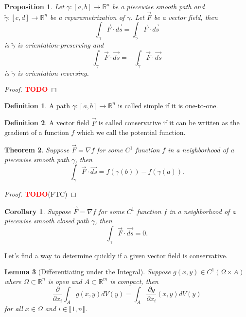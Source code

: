 \documentclass{article}
\theoremstyle{plain}
\newtheorem{theorem}{Theorem}[subsection]
\newtheorem{proposition}[theorem]{Proposition}
\newtheorem{lemma}[theorem]{Lemma}
\newtheorem*{corollary}{Corollary}
\theoremstyle{definition}
\newtheorem*{definition}{Definition}
\newcommand{\R}{\mathbb{R}}
\newcommand{\Iint}[2]{\llbracket #1 , #2 \rrbracket}
\newcommand{\td}{\textcolor{red}{\textbf{TODO}}}
\begin{document}
\begin{proposition}
    Let $\gamma : [a,b] \to \R^n$ be a piecewise smooth path and $\tilde\gamma : [c,d] \to \R^n$ be a reparametrization of $\gamma$. Let $\vec{F}$ be a vector field, then
    $$\int_{\gamma}\vec{F}\cdot \vec{ds} = \int_{\tilde\gamma}\vec{F}\cdot \vec{ds}$$
    is $\tilde\gamma$ is orientation-preserving and 
    $$\int_{\gamma}\vec{F}\cdot \vec{ds} = -\int_{\tilde\gamma}\vec{F}\cdot \vec{ds}$$
    is $\tilde\gamma$ is orientation-reversing.
\end{proposition}

\begin{proof}
    \td 
\end{proof}

\begin{definition}
    A path $\gamma : [a,b] \to \R^n$ is called simple if it is one-to-one.
\end{definition}

\begin{definition}
    A vector field $\vec{F}$ is called conservative if it can be written as the gradient of a function $f$ which we call the potential function.
\end{definition}

\begin{theorem}
    Suppose $\vec{F} = \nabla f$ for some $C^1$ function $f$ in a neighborhood of a piecewise smooth path $\gamma$, then
    $$\int_{\gamma}\vec{F}\cdot \vec{ds} = f(\gamma(b)) - f(\gamma(a)).$$
\end{theorem}

\begin{proof}
    \td (FTC)
\end{proof}

\begin{corollary}
    Suppose $\vec{F} = \nabla f$ for some $C^1$ function $f$ in a neighborhood of a piecewise smooth closed path $\gamma$, then
    $$\int_{\gamma}\vec{F}\cdot \vec{ds} = 0.$$
\end{corollary}

Let's find a way to determine quickly if a given vector field is conservative.

\begin{lemma}[Differentiating under the Integral]
    Suppose $g(x,y) \in C^1(\Omega \times A)$ where $\Omega \subset \R^n$ is open and $A \subset \R^m$ is compact, then
    $$\frac{\partial}{\partial x_i}\int_Ag(x,y)dV(y) = \int_A \frac{\partial g}{\partial x_i}(x,y)dV(y)$$
    for all $x \in \Omega$ and $i \in \Iint{1}{n}$.
\end{lemma}
\end{document}
